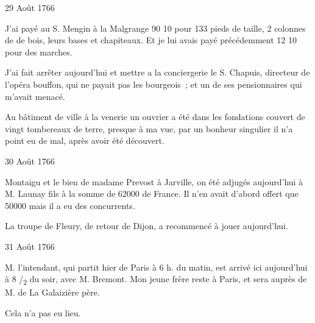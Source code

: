                      \begin{diary}{29 Août 1766}{}
                        
                         J'ai payé au S. Mengin à la
                              Malgrange
                           90 10 pour 133 pieds de taille, 2 colonnes de de bois, leurs bases et chapiteaux. Et je lui avais
                           payé précédemment 12 10
                           pour des marches. \bigskip
        
        
                         J'ai fait arrêter aujourd'hui et
                           mettre a la
                              conciergerie
                           le S. Chapuis, directeur de
                           l'opéra
                           bouffon, qui ne payait pas les bourgeois ; et
                           un de ses pensionnaires qui m'avait menacé. \bigskip
        
        
                         Au bâtiment de ville à la venerie un ouvrier a été dans
                           les fondations couvert de vingt tombereaux de
                           terre, presque à ma vue, par un bonheur
                           singulier il n'a point eu de mal, après avoir
                           été découvert. \bigskip
        
        
                     \end{diary}

                     \begin{diary}{30 Août 1766}{}
                        
                        
                           Montaigu et le bien de madame Prevost à
                           Jarville, on été adjugés aujourd'hui à M.
                              Launay fils à la somme de 62000 de
                              France. Il n'en avait d'abord offert que
                           50000 mais il a eu des concurrents. \bigskip
        
        
                         La troupe de Fleury, de retour de Dijon,
                           a recommencé à jouer aujourd'hui. \bigskip
        
        
                     \end{diary}

                     \begin{diary}{31 Août 1766}{}
                        
                        
                           M. l'intendant, qui partit hier
                           de Paris
                           à 6 h. du matin, est arrivé ici aujourd'hui
                           à 8 /\textsubscript{2} du soir, avec
                              M. Bremont. Mon
                              jeune frère reste à Paris, et sera
                           auprès de M. de La Galaizière père. \bigskip
        
        
                        
                           Cela n'a pas eu lieu.
                        \bigskip
        
        
                     \end{diary}
